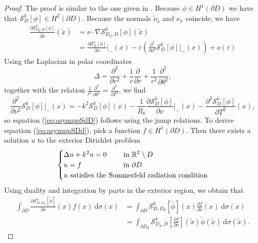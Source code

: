 \documentclass[a4paper]{article}
\theoremstyle{definition}
\newcommand{\R}{\mathbb{R}}
\renewcommand{\S}{\mathcal{S}}
\renewcommand{\epsilon}{\varepsilon}
\newcommand{\dx}{\: \mathrm{d}}
\newcommand{\eqnref}[1]{(\ref {#1})}
\begin{document}
\begin{proof}
The proof is similar to the one given in \cite{asymptoticsderivative}. Because $\phi\in H^1(\partial D)$ we have that $\S_D^k[\phi]\in H^2(\partial D)$. Because the normals $\tilde{\nu}_{\tilde{x}}$ and $\nu_x$ coincide, we have
\begin{align*}
\frac{\partial \S_{D_d,D}^k[\phi]}{\partial \tilde{\nu}} (\tilde{x}) &= \nu \cdot \nabla \S_{D_d,D}^k[\phi](\tilde{x}) \\
&= \frac{\partial \S_D^k[\phi]}{\partial \nu} \bigg|_{-}(x) - \epsilon\left(\frac{\partial^2}{\partial \nu^2}\S_D^k[\phi]\bigg|_{-}(x) \right) + o(\epsilon)
\end{align*}
Using the Laplacian in polar coordinates
\begin{equation*}
\Delta = \frac{\partial^2}{\partial r^2} + \frac{1}{r}\frac{\partial}{\partial r} + \frac{1}{r^2}\frac{\partial^2}{\partial \theta^2},
\end{equation*}
together with the relation $\frac{1}{r^2}\frac{\partial^2}{\partial \theta^2} = \frac{\partial^2}{\partial T^2}$, we find
\begin{equation*}
\frac{\partial^2}{\partial \nu^2}\S_D^k[\phi]\bigg|_{-}(x) = -k^2\S_D^k[\phi](x) -\frac{1}{R_b}\frac{\partial \S_D^k[\phi]}{\partial \nu}\bigg|_{-}(x) - \frac{\partial^2 \S_D^k[\phi]}{\partial T^2}(x),
\end{equation*}
so equation \eqnref{eq:asymppSdD} follows using the jump relations. To derive equation \eqnref{eq:asymppSDd}, pick a function $f\in H^1(\partial D)$. Then there exists a solution $u$ to the exterior Dirichlet problem
\begin{equation*}
\begin{cases}
\Delta u + k^2 u = 0 \quad &\text{in } \R^2\setminus D \\
u = f & \text{in } \partial D \\
u \text{ satisfies the So} &\hspace{-10pt}\text{mmerfeld radiation condition}
\end{cases}
\end{equation*}
Using duality and integration by parts in the exterior region, we obtain that
\begin{align*}
\int_{\partial D} \frac{\partial \S_{D,D_d}^k[\tilde{\phi}]}{\partial \nu} (x) f(x) \dx \sigma(x) &= \int_{\partial D} \S_{D,D_d}^k[\tilde{\phi}](x)\frac{\partial f }{\partial \nu} (x)  \dx \sigma(x) \\
&= \int_{\partial D_d} \S_{D_d,D}^k\left[\frac{\partial f }{\partial \nu}\right](\tilde{x})\tilde{\phi}(\tilde{x}) \dx \sigma(\tilde{x}).

\end{align*}
\end{proof}
\end{document}
